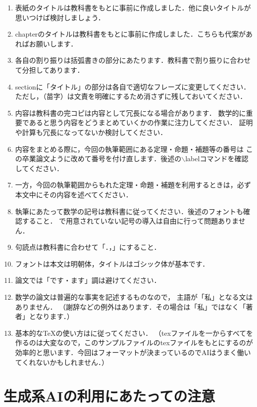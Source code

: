 \documentclass[12pt,a4j,final]{jreport}
\theoremstyle{definition}
\begin{document}
\begin{enumerate}[(1)]
\item 表紙のタイトルは教科書\cite{Koike}をもとに事前に作成しました．他に良いタイトルが思いつけば検討しましょう．
\item chapterのタイトルは教科書\cite{Koike}をもとに事前に作成しました．こちらも代案があればお願いします．
\item 各自の割り振りは括弧書きの部分にあたります．教科書で割り振りに合わせて分担してあります．
\item sectionに「タイトル」の部分は各自で適切なフレーズに変更してください．
ただし，（苗字）は文責を明確にするため消さずに残しておいてください．
\item 内容は教科書\cite{Koike}の完コピは内容として冗長になる場合があります．
数学的に重要であると思う内容をどうまとめていくかの作業に注力してください．
証明や計算も冗長になってないか検討してください．
\item 内容をまとめる際に，今回の執筆範囲にある定理・命題・補題等の番号は
この卒業論文ように改めて番号を付け直します．後述の$\backslash$labelコマンドを確認してください．
\item 一方，今回の執筆範囲からもれた定理・命題・補題を利用するときは，必ず本文中にその内容を述べてください．
\item 執筆にあたって数学の記号は教科書\cite{Koike}に従ってください．後述のフォントも確認すること．
\cite{Koike}で用意されていない記号の導入は自由に行って問題ありません．
\item 句読点は教科書\cite{Koike}に合わせて「．，」にすること．
\item フォントは本文は明朝体，タイトルはゴシック体が基本です．
\item 論文では「です・ます」調は避けてください．
\item 数学の論文は普遍的な事実を記述するものなので，
主語が「私」となる文はありません．
（謝辞などの例外はあります．その場合は「私」ではなく「著者」となります．）
\item 基本的な\TeX の使い方は\cite{OK}に従ってください．
（texファイルを一からすべてを作るのは大変なので，このサンプルファイルのtexファイルをもとにするのが効率的と思います．今回はフォーマットが決まっているのでAIはうまく働いてくれないかもしれません．）
\end{enumerate}


\section{生成系AIの利用にあたっての注意}
\end{document}
